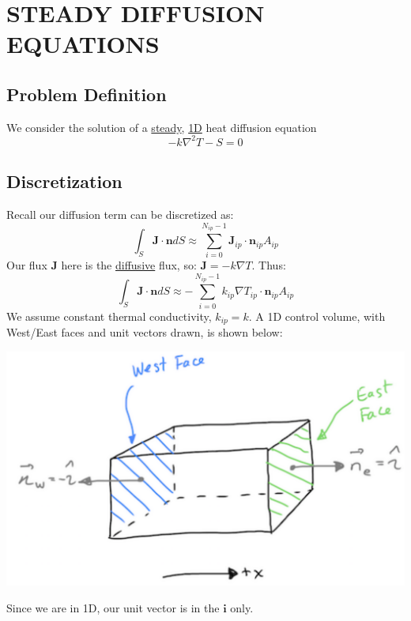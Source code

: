 \documentclass[11pt]{article}
\begin{document}
\section{STEADY DIFFUSION EQUATIONS}
\label{sec:org599b2a4}
\subsection{Problem Definition}
\label{sec:org52c9cbf}
We consider the solution of a \uline{steady}, \uline{1D} heat diffusion equation
\begin{equation}
-k \nabla^2 T - S = 0
\end{equation}
\subsection{Discretization}
\label{sec:orgdf36a33}
Recall our diffusion term can be discretized as:
\begin{equation}
\int_S \textbf{J} \cdot \textbf{n} dS \approx \sum_{i=0}^{N_{ip}-1} \textbf{J}_{ip}\cdot \textbf{n}_{ip}A_{ip}
\end{equation}
Our flux \(\textbf{J}\) here is the \uline{diffusive} flux, so: \(\textbf{J} = -k \nabla T\). Thus:
\begin{equation}
\int_S \textbf{J} \cdot \textbf{n} dS \approx -\sum_{i=0}^{N_{ip}-1} k_{ip} \nabla T_{ip}  \cdot \textbf{n}_{ip}A_{ip}
\end{equation}
We assume constant thermal conductivity, \(k_{ip} = k\). A 1D control volume, with West/East faces and unit vectors drawn, is shown below:
\begin{center}
\includegraphics[scale=0.2]{../pic/heat1D_CV.png}
\end{center}
Since we are in 1D, our unit vector is in the \(\textbf{i}\) only.\\
\end{document}
